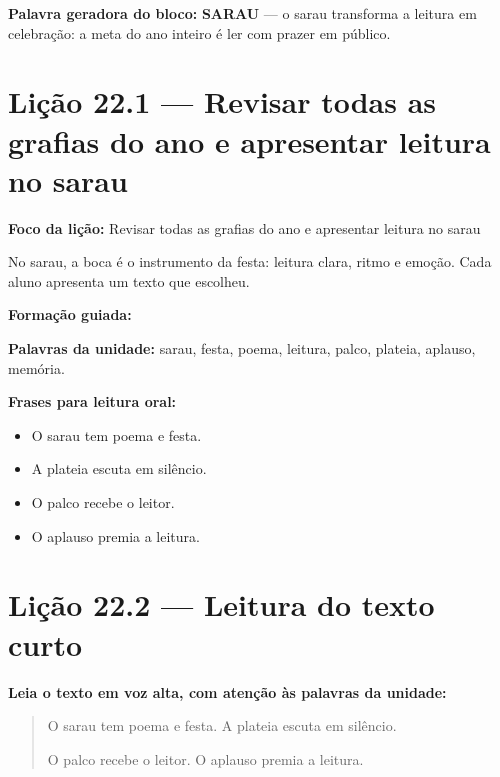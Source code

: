 \textbf{Palavra geradora do bloco:} \textbf{SARAU} --- o sarau transforma a leitura em celebração: a meta do ano inteiro é ler com prazer em público.

\section{Lição 22.1 --- Revisar todas as grafias do ano e apresentar leitura no sarau}

\textbf{Foco da lição:} Revisar todas as grafias do ano e apresentar leitura no sarau


\begin{boquinha}
No sarau, a boca é o instrumento da festa: leitura clara, ritmo e emoção. Cada aluno apresenta um texto que escolheu.
\end{boquinha}

\noindent\textbf{Formação guiada:}

\begin{center}
\end{center}

\noindent\textbf{Palavras da unidade:} sarau, festa, poema, leitura, palco, plateia, aplauso, memória.

\noindent\textbf{Frases para leitura oral:}
\begin{itemize}[leftmargin=1.6em]
  \item O sarau tem poema e festa.
  \item A plateia escuta em silêncio.
  \item O palco recebe o leitor.
  \item O aplauso premia a leitura.
\end{itemize}

\section{Lição 22.2 --- Leitura do texto curto}

\noindent\textbf{Leia o texto em voz alta, com atenção às palavras da unidade:}


\begin{quote}
O sarau tem poema e festa. A plateia escuta em silêncio.

O palco recebe o leitor. O aplauso premia a leitura.
\end{quote}

